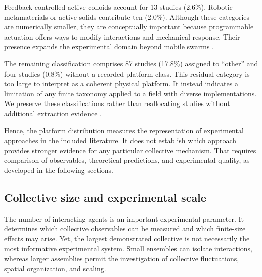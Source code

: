 Feedback-controlled active colloids account for 13 studies (2.6\%). Robotic metamaterials or active solids contribute ten (2.0\%). Although these categories are numerically smaller, they are conceptually important because programmable actuation offers ways to modify interactions and mechanical response. Their presence expands the experimental domain beyond mobile swarms \cite{Martinet2022rotationcontrolin,Yan2014colloidalsuperstruc,Chen2024synchronousandfull,Buerle2020formationofstable,Aubret2021metamachinesofplur,Heuthe2025tunablecolloidalsw,Knippenberg2022roleofcohesionin,Lffler2023collectiveforaging,Han2020programmablechiral,Chen2022collectiveresponse,Guo2026afeedbackcontrolle,Chen2024persistentandrespo,Lffler2021behaviordependentc,Baconnier2022tensioncontrolledc,Zhang2026noiseenhancedtempo,Rezanejad2025programmableentangl,Brandenbourger2019nonreciprocalrobot,Du2026metamaterialsthatl,Brandenbourger2021limitcyclesturnac,Binysh2026moreislessinunpe,Coulais2025activemetamaterials,Chen2020selfsensingmetamat}.

The remaining classification comprises 87 studies (17.8\%) assigned to ``other'' and four studies (0.8\%) without a recorded platform class. This residual category is too large to interpret as a coherent physical platform. It instead indicates a limitation of any finite taxonomy applied to a field with diverse implementations. We preserve these classifications rather than reallocating studies without additional extraction evidence \cite{Zhou2021synchronizedswimmin,Gravish2023coordinatedcollecti,Li2024memoryinducedspont,Lin2024decodingfrequencies,Zion2024amechanicalorigin,Schilling2019learningvisionbase,Brandsttter2022multiagentspatial,Beaver2022aconstraintdriven,Li2025llmflockdecentral,Tan2025goflockgoalorien,Verdoucq2025flockingphasetrans,Lin2025whyorbweavingspid,Choi2026communicationfreec}.

Hence, the platform distribution measures the representation of experimental approaches in the included literature. It does not establish which approach provides stronger evidence for any particular collective mechanism. That requires comparison of observables, theoretical predictions, and experimental quality, as developed in the following sections.

\subsection{Collective size and experimental scale}
\label{sec:results-scale}

The number of interacting agents is an important experimental parameter. It determines which collective observables can be measured and which finite-size effects may arise. Yet, the largest demonstrated collective is not necessarily the most informative experimental system. Small ensembles can isolate interactions, whereas larger assemblies permit the investigation of collective fluctuations, spatial organization, and scaling.

